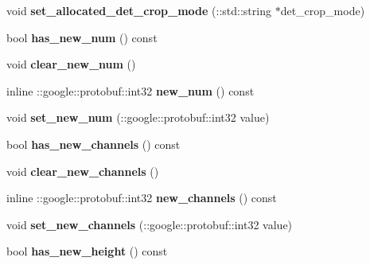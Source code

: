 \begin{DoxyCompactItemize}
void {\bfseries set\+\_\+allocated\+\_\+det\+\_\+crop\+\_\+mode} (\+::std\+::string $\ast$det\+\_\+crop\+\_\+mode)
\item 
\mbox{\label{classcaffe_1_1_v0_layer_parameter_a138b6408702d2df36086d314f97023f8}} 
bool {\bfseries has\+\_\+new\+\_\+num} () const
\item 
\mbox{\label{classcaffe_1_1_v0_layer_parameter_af108c4334e5cbfdafcf84bf0795dea29}} 
void {\bfseries clear\+\_\+new\+\_\+num} ()
\item 
\mbox{\label{classcaffe_1_1_v0_layer_parameter_a3f05113872d063acca8e5afdcebc5844}} 
inline \+::google\+::protobuf\+::int32 {\bfseries new\+\_\+num} () const
\item 
\mbox{\label{classcaffe_1_1_v0_layer_parameter_aaa138be72aaf0686f7b4b63d6c2ba1be}} 
void {\bfseries set\+\_\+new\+\_\+num} (\+::google\+::protobuf\+::int32 value)
\item 
\mbox{\label{classcaffe_1_1_v0_layer_parameter_a90e319602d23542ec0f37f12184c70f8}} 
bool {\bfseries has\+\_\+new\+\_\+channels} () const
\item 
\mbox{\label{classcaffe_1_1_v0_layer_parameter_a6396319ce6b06b8219a15ef3edba1163}} 
void {\bfseries clear\+\_\+new\+\_\+channels} ()
\item 
\mbox{\label{classcaffe_1_1_v0_layer_parameter_adacd791be464c5d5b5a67a9ed5d30d73}} 
inline \+::google\+::protobuf\+::int32 {\bfseries new\+\_\+channels} () const
\item 
\mbox{\label{classcaffe_1_1_v0_layer_parameter_a9e942e6312390b2b5ba370325f776b20}} 
void {\bfseries set\+\_\+new\+\_\+channels} (\+::google\+::protobuf\+::int32 value)
\item 
\mbox{\label{classcaffe_1_1_v0_layer_parameter_a2ea52cc1e1f586f34b03c7ae2c0e45c7}} 
bool {\bfseries has\+\_\+new\+\_\+height} () const
\item 

\end{DoxyCompactItemize}
